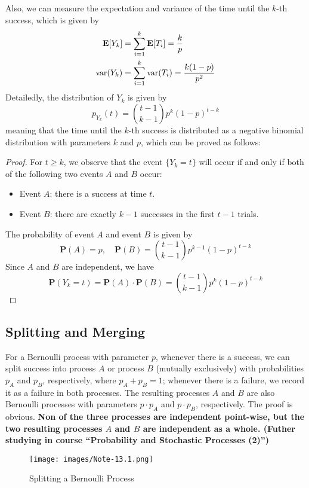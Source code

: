 \documentclass[device=normal, lang=en]{elegantbook}
\numberwithin{equation}{section}
\begin{document}
Also, we can measure the expectation and variance of the time until the $k$-th success, which is given by
\begin{align}
    \mathbf{E}\qty[Y_k] &= \sum_{i=1}^{k} \mathbf{E}\qty[T_i] = \frac{k}{p} \\
    \mathrm{var}\qty(Y_k) &= \sum_{i=1}^{k} \mathrm{var}\qty(T_i) = \frac{k(1-p)}{p^2}
\end{align}
Detailedly, the distribution of $Y_k$ is given by
\begin{equation}
    p_{Y_k}(t) = \binom{t-1}{k-1} p^k (1-p)^{t-k}
\end{equation}
meaning that the time until the $k$-th success is distributed as a negative binomial distribution with parameters $k$ and $p$, which can be proved as follows:
\begin{proof}
    For $t \geq k$, we observe that the event $\{Y_k = t\}$ will occur if and only if both of the following two events $A$ and $B$ occur:
    \begin{itemize}
        \item Event $A$: there is a success at time $t$.
        \item Event $B$: there are exactly $k-1$ successes in the first $t-1$ trials.
    \end{itemize}
    The probability of event $A$ and event $B$ is given by
    \begin{equation}
        \mathbf{P}(A) = p, \quad \mathbf{P}(B) = \binom{t-1}{k-1} p^{k-1} (1-p)^{t-k}
    \end{equation}
    Since $A$ and $B$ are independent, we have
    \begin{equation}
        \mathbf{P}(Y_k = t) = \mathbf{P}(A) \cdot \mathbf{P}(B) = \binom{t-1}{k-1} p^k (1-p)^{t-k}
    \end{equation}
\end{proof}

\subsection{Splitting and Merging}
For a Bernoulli process with parameter $p$, whenever there is a success, we can split success into process $A$ or process $B$ (mutually exclusively) with probabilities $p_A$ and $p_B$, respectively, where $p_A + p_B = 1$; whenever there is a failure, we record it as a failure in both processes. The resulting processes $A$ and $B$ are also Bernoulli processes with parameters $p\cdot p_A$ and $p \cdot p_B$, respectively. The proof is obvious. \textbf{Non of the three processes are independent point-wise, but the two resulting processes $A$ and $B$ are independent as a whole. (Futher studying in course ``Probability and Stochastic Processes (2)'')}
\begin{figure}[H]
    \centering
    \texttt{[image: images/Note-13.1.png]}
    \caption{Splitting a Bernoulli Process}
\end{figure}
\end{document}
